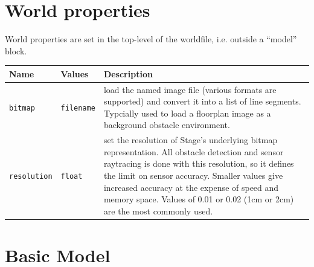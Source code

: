 \documentclass[letter,11pt,twoside]{report}
\begin{document}
\section{World properties}

World properties are set in the top-level of the worldfile,
i.e. outside a ``model'' block.

\begin{tabularx}{\columnwidth}{llX}
\hline
Name & Values & Description \\
\hline

\verb'bitmap' & \verb'filename' & load the named image file (various
formats are supported) and convert it into a list of line
segments. Typcially used to load a floorplan image as a background obstacle environment.\\

\verb'resolution' & \verb'float' & set the resolution of Stage's
underlying bitmap representation. All obstacle detection and sensor
raytracing is done with this resolution, so it defines the limit on
sensor accuracy. Smaller values give increased accuracy at the expense
of speed and memory space. Values of 0.01 or 0.02 (1cm or 2cm) are the
most commonly used. \\

\end{tabularx}



\newpage
\section{Basic Model}
\end{document}
